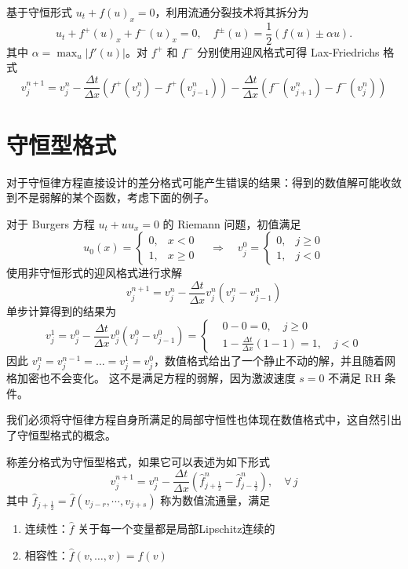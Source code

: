 \begin{example}
    基于守恒形式 $u_t + f(u)_x = 0$，利用流通分裂技术将其拆分为
    \[
        u_t + f^+(u)_x + f^-(u)_x = 0,\quad f^{\pm}(u) = \frac12(f(u)\pm \alpha u).
    \]
    其中 $\alpha = \max_u |f'(u)|$。对 $f^+$ 和 $f^-$ 分别使用迎风格式可得 Lax-Friedrichs 格式
    \[
        v_j^{n+1} = v_j^n - \frac{\Delta t}{\Delta x}(f^+(v_{j}^n)-f^+(v_{j-1}^n))
        - \frac{\Delta t}{\Delta x}(f^-(v_{j+1}^n)-f^-(v_{j}^n))
    \]
\end{example}

\section{守恒型格式}

对于守恒律方程直接设计的差分格式可能产生错误的结果：得到的数值解可能收敛到不是弱解的某个函数，考虑下面的例子。

\begin{example}
    对于 Burgers 方程 $u_t + u u_x = 0$ 的 Riemann 问题，初值满足
    \[
        u_0(x) =
        \begin{cases}
            0, & x < 0   \\
            1, & x \ge 0
        \end{cases} \quad \Rightarrow \quad  v_j^0 =
        \begin{cases}
            0, & j \ge 0 \\
            1, & j < 0
        \end{cases}
    \]
    使用非守恒形式的迎风格式进行求解
    \[
        v_j^{n+1} = v_j^n - \frac{\Delta t}{\Delta x} v_j^n (v_{j}^n-v_{j-1}^n)
    \]
    单步计算得到的结果为
    \[
        v_j^1 = v_j^0 - \frac{\Delta t}{\Delta x} v_j^0 (v_{j}^0 - v_{j-1}^0)
        =
        \left\{
        \begin{aligned}
             & 0 - 0 = 0,\quad j \ge 0                             \\
             & 1 - \frac{\Delta t}{\Delta x}(1-1) = 1, \quad j < 0
        \end{aligned}
        \right.
    \]
    因此 $v_j^n = v_j^{n-1} = \dots = v_j^1 = v_j^0$，数值格式给出了一个静止不动的解，并且随着网格加密也不会变化。
    这不是满足方程的弱解，因为激波速度 $s = 0$ 不满足 RH 条件。
\end{example}

我们必须将守恒律方程自身所满足的局部守恒性也体现在数值格式中，这自然引出了守恒型格式的概念。

\begin{definition}[守恒型格式]
    称差分格式为守恒型格式，如果它可以表述为如下形式
    \[
        v_{j}^{n+1} = v_j^n - \frac{\Delta t}{\Delta x}\left(
        \hat{f}_{j+\frac12}^n - \hat{f}_{j-\frac12}^n
        \right),\quad \forall\,j
    \]
    其中 $\hat{f}_{j+\frac12} = \hat{f}(v_{j-r},\cdots,v_{j+s})$ 称为数值流通量，满足
    \begin{enumerate}
        \item 连续性：$\hat{f}$ 关于每一个变量都是局部Lipschitz连续的
        \item 相容性：$\hat{f}(v,\dots,v) = f(v)$
    \end{enumerate}
\end{definition}

